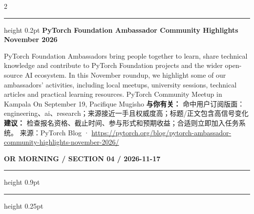 \documentclass[10.5pt]{ctexart}
\begin{document}
\begin{multicols}{2}
\vspace{2mm}
\hrule height 0.2pt
\vspace{2mm}
{\large\bfseries PyTorch Foundation Ambassador Community Highlights November 2026}\par
PyTorch Foundation Ambassadors bring people together to learn, share technical knowledge and contribute to PyTorch Foundation projects and the wider open-source AI ecosystem. In this November roundup, we highlight some of our ambassadors’ activities, including local meetups, university sessions, technical articles and practical learning resources. PyTorch Community Meetup in Kampala On September 19, Pacifique Mugisho
\textbf{与你有关：} 命中用户订阅版面：engineering、ai、research；来源接近一手且权威度高；标题/正文包含高信号变化
\textbf{建议：} 检查报名资格、截止时间、参与形式和预期收益；合适则立即加入任务系统。
{\footnotesize\color{ormuted} 来源：PyTorch Blog · \url{https://pytorch.org/blog/pytorch-ambassador-community-highlights-november-2026/}}
\end{multicols}
\newpage
{\small\bfseries OR MORNING / SECTION 04 / 2026-11-17}
\vspace{2mm}
\hrule height 0.9pt
\vspace{1.5mm}
\hrule height 0.25pt
\vspace{4mm}
\end{document}
